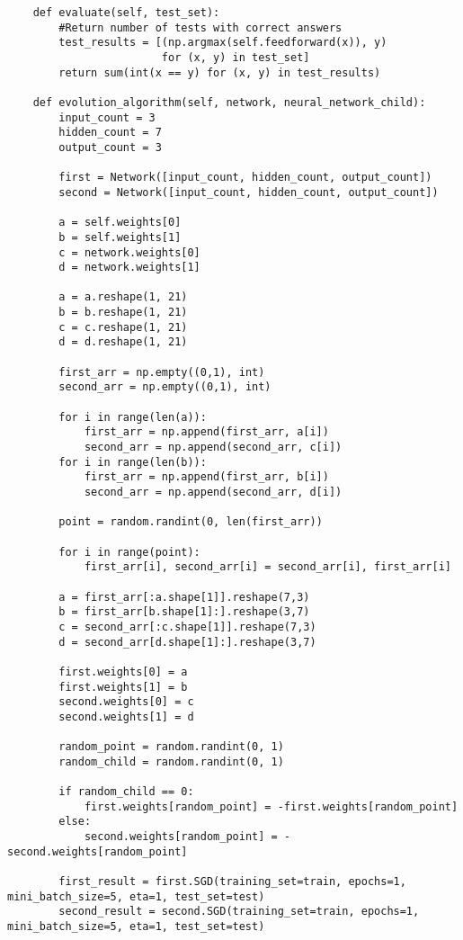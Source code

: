 \begin{lstlisting}
    def evaluate(self, test_set):
        #Return number of tests with correct answers
        test_results = [(np.argmax(self.feedforward(x)), y)
                        for (x, y) in test_set]
        return sum(int(x == y) for (x, y) in test_results)

    def evolution_algorithm(self, network, neural_network_child):
        input_count = 3
        hidden_count = 7
        output_count = 3

        first = Network([input_count, hidden_count, output_count])
        second = Network([input_count, hidden_count, output_count])
        
        a = self.weights[0]
        b = self.weights[1]
        c = network.weights[0]
        d = network.weights[1]
                
        a = a.reshape(1, 21)
        b = b.reshape(1, 21)
        c = c.reshape(1, 21)
        d = d.reshape(1, 21)
        
        first_arr = np.empty((0,1), int)
        second_arr = np.empty((0,1), int)

        for i in range(len(a)):
            first_arr = np.append(first_arr, a[i])
            second_arr = np.append(second_arr, c[i])
        for i in range(len(b)):
            first_arr = np.append(first_arr, b[i])
            second_arr = np.append(second_arr, d[i])
        
        point = random.randint(0, len(first_arr))
    
        for i in range(point):
            first_arr[i], second_arr[i] = second_arr[i], first_arr[i]
            
        a = first_arr[:a.shape[1]].reshape(7,3)
        b = first_arr[b.shape[1]:].reshape(3,7)
        c = second_arr[:c.shape[1]].reshape(7,3)
        d = second_arr[d.shape[1]:].reshape(3,7)
        
        first.weights[0] = a
        first.weights[1] = b
        second.weights[0] = c
        second.weights[1] = d
        
        random_point = random.randint(0, 1)
        random_child = random.randint(0, 1)
        
        if random_child == 0:
            first.weights[random_point] = -first.weights[random_point]
        else:
            second.weights[random_point] = -second.weights[random_point]
        
        first_result = first.SGD(training_set=train, epochs=1, mini_batch_size=5, eta=1, test_set=test)
        second_result = second.SGD(training_set=train, epochs=1, mini_batch_size=5, eta=1, test_set=test)
        

\end{lstlisting}
